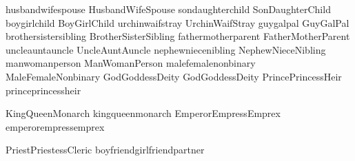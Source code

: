 \mfornb{\spouse}	{husband}{wife}{spouse}
\mfornb{\Spouse}	{Husband}{Wife}{Spouse}
\mfornb{\offspring}	{son}{daughter}{child}
\mfornb{\Offspring}	{Son}{Daughter}{Child}
\mfornb{\child}		{boy}{girl}{child}
\mfornb{\Child}		{Boy}{Girl}{Child}
\mfornb{\stray}	{urchin}{waif}{stray}
\mfornb{\Stray}	{Urchin}{Waif}{Stray}
\mfornb{\pal}		{guy}{gal}{pal}
\mfornb{\Pal}		{Guy}{Gal}{Pal}
\mfornb{\sibling}	{brother}{sister}{sibling}
\mfornb{\Sibling}	{Brother}{Sister}{Sibling}
\mfornb{\parent}	{father}{mother}{parent}
\mfornb{\Parent}	{Father}{Mother}{Parent}
\mfornb{\auncle}	{uncle}{aunt}{auncle}
\mfornb{\Auncle}	{Uncle}{Aunt}{Auncle}
\mfornb{\nibling}	{nephew}{niece}{nibling}
\mfornb{\Nibling}	{Nephew}{Niece}{Nibling}
\mfornb{\person}	{man}{woman}{person} %
\mfornb{\Person}	{Man}{Woman}{Person}
\mfornb{\sex}		{male}{female}{nonbinary}
\mfornb{\Sex}		{Male}{Female}{Nonbinary}
\mfornb{\God}		{God}{Goddess}{Deity}
\mfornb{\Deity}		{God}{Goddess}{Deity}
\mfornb{\Heir}		{Prince}{Princess}{Heir}
\mfornb{\heir}		{prince}{princess}{heir}

\mfornb{\Monarch}		{King}{Queen}{Monarch}
\mfornb{\monarch}		{king}{queen}{monarch}
\mfornb{\Emperor}		{Emperor}{Empress}{Emprex} %
\mfornb{\emperor}		{emperor}{empress}{emprex}

\mfornb{\cleric}		{Priest}{Priestess}{Cleric}
\mfornb{\partner}	{boyfriend}{girlfriend}{partner}


